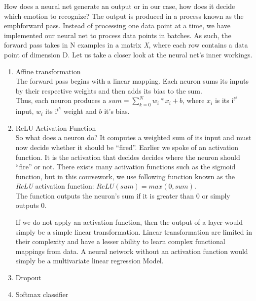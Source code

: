 How does a neural net generate an output or in our case, how does it decide which emotion to recognize?
The output is produced in a process known as the emph{forward pass}.
Instead of processing one data point at a time,
we have implemented our neural net to process data points in batches.
As such, the forward pass takes in N examples in a matrix \emph{X}, where each row contains a data point of dimension D.
Let us take a closer look at the neural net's inner workings.

\begin{enumerate}
   \item Affine transformation\\
     The forward pass begins with a linear mapping.
     Each neuron sums its inputs by their respective weights and then adds its bias to the sum.\\
     Thus, each neuron produces a $sum = \sum_{k=0}^{N} w_i * x_i + b$,
     where $x_i$ is its i$^t^h$ input, $w_i$ its i$^t^h$ weight and $b$ it's bias.
     
   \item ReLU Activation Function\\
     So what does a neuron do? It computes a weighted sum of its input and must now decide whether it should be ``fired''.
     Earlier we spoke of an activation function.
     It is the activation that decides decides where the neuron should ``fire'' or not. 
     There exists many activation functions such as the sigmoid function,
     but in this coursework, we use following function known as the \emph{ReLU} activation function:
     $ReLU(sum) = max(0,sum)$.\\
     The function outputs the neuron's sum if it is greater than 0 or simply outputs 0.

     If we do not apply an activation function, then the output of a layer would simply be a simple linear transformation.
     Linear transformation are limited in their complexity and have a lesser ability to learn complex functional mappings from data.
     A neural network without an activation function would simply be a multivariate linear regression Model.

   \item Dropout\\


   \item Softmax classifier\\

\end{enumerate}     

